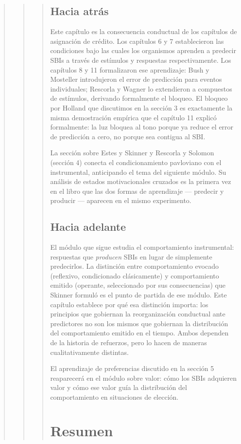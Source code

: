 \documentclass[
  letterpaper,
  DIV=11,
  numbers=noendperiod]{scrreprt}
\begin{document}
\begin{tcolorbox}[enhanced jigsaw, toprule=.15mm, arc=.35mm, colback=white, opacityback=0, colframe=quarto-callout-note-color-frame, breakable, rightrule=.15mm, left=2mm, leftrule=.75mm, bottomrule=.15mm]
\begin{quote}
\begin{quote}
\begin{quote}
\subsection{Hacia atrás}\label{hacia-atruxe1s}

Este capítulo es la consecuencia conductual de los capítulos de
asignación de crédito. Los capítulos 6 y 7 establecieron las condiciones
bajo las cuales los organismos aprenden a predecir SBIs a través de
estímulos y respuestas respectivamente. Los capítulos 8 y 11
formalizaron ese aprendizaje: Bush y Mosteller introdujeron el error de
predicción para eventos individuales; Rescorla y Wagner lo extendieron a
compuestos de estímulos, derivando formalmente el bloqueo. El bloqueo
por Holland que discutimos en la sección 3 es exactamente la misma
demostración empírica que el capítulo 11 explicó formalmente: la luz
bloquea al tono porque ya reduce el error de predicción a cero, no
porque sea contigua al SBI.

La sección sobre Estes y Skinner y Rescorla y Solomon (sección 4)
conecta el condicionamiento pavloviano con el instrumental, anticipando
el tema del siguiente módulo. Su análisis de estados motivacionales
cruzados es la primera vez en el libro que las dos formas de aprendizaje
--- predecir y producir --- aparecen en el mismo experimento.

\subsection{Hacia adelante}\label{hacia-adelante}

El módulo que sigue estudia el comportamiento instrumental: respuestas
que \emph{producen} SBIs en lugar de simplemente predecirlos. La
distinción entre comportamiento evocado (reflexivo, condicionado
clásicamente) y comportamiento emitido (operante, seleccionado por sus
consecuencias) que Skinner formuló es el punto de partida de ese módulo.
Este capítulo establece por qué esa distinción importa: los principios
que gobiernan la reorganización conductual ante predictores no son los
mismos que gobiernan la distribución del comportamiento emitido en el
tiempo. Ambos dependen de la historia de refuerzos, pero lo hacen de
maneras cualitativamente distintas.

El aprendizaje de preferencias discutido en la sección 5 reaparecerá en
el módulo sobre valor: cómo los SBIs adquieren valor y cómo ese valor
guía la distribución del comportamiento en situaciones de elección.

\section{Resumen}\label{resumen-6}


\end{quote}
\end{quote}
\end{quote}
\end{tcolorbox}
\end{document}
